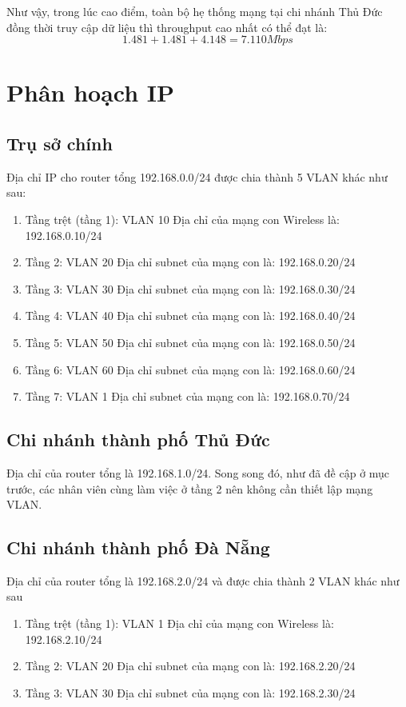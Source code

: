 \documentclass[a4paper]{article}
\begin{document}
Như vậy, trong lúc cao điểm, toàn bộ hẹ thống mạng tại chi nhánh Thủ Đức đồng thời truy cập dữ liệu thì throughput cao nhất có thể đạt là:
\[1.481 + 1.481 + 4.148 = 7.110 Mbps\]


\section{Phân hoạch IP}
\subsection{Trụ sở chính}
Địa chỉ IP cho router tổng 192.168.0.0/24 được chia thành 5 VLAN khác như sau:
\begin{enumerate}
    \item Tầng trệt (tầng 1): VLAN 10
    Địa chỉ của mạng con Wireless là: 192.168.0.10/24
    \item Tầng 2: VLAN 20
    Địa chỉ subnet của mạng con là: 192.168.0.20/24
    \item Tầng 3: VLAN 30
    Địa chỉ subnet của mạng con là: 192.168.0.30/24
    \item Tầng 4: VLAN 40
    Địa chỉ subnet của mạng con là: 192.168.0.40/24
    \item Tầng 5: VLAN 50
    Địa chỉ subnet của mạng con là: 192.168.0.50/24
    \item Tầng 6: VLAN 60
    Địa chỉ subnet của mạng con là: 192.168.0.60/24
    \item Tầng 7: VLAN 1
    Địa chỉ subnet của mạng con là: 192.168.0.70/24
\end{enumerate}
\subsection{Chi nhánh thành phố Thủ Đức}
Địa chỉ của router tổng là 192.168.1.0/24. Song song đó, như đã đề cập ở mục trước, các nhân viên cùng làm việc ở tầng 2 nên không cần thiết lập mạng VLAN.
\subsection{Chi nhánh thành phố Đà Nẵng}
Địa chỉ của router tổng là 192.168.2.0/24 và được chia thành 2 VLAN khác như sau
\begin{enumerate}
    \item Tầng trệt (tầng 1): VLAN 1
    Địa chỉ của mạng con Wireless là: 192.168.2.10/24
    \item Tầng 2: VLAN 20
    Địa chỉ subnet của mạng con là: 192.168.2.20/24
    \item Tầng 3: VLAN 30
    Địa chỉ subnet của mạng con là: 192.168.2.30/24
\end{enumerate}
\end{document}

